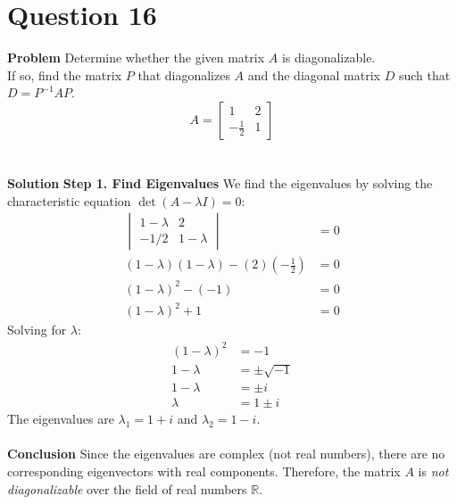\documentclass{article}
\begin{document}
\section{Question 16}
\textbf{Problem}
Determine whether the given matrix $A$ is diagonalizable. \\
If so, find the matrix $P$ that diagonalizes $A$ and the diagonal matrix $D$
such that $D = P^{-1}AP$.
\[
	A =
	\begin{bmatrix}
		1            & 2 \\
		-\frac{1}{2} & 1
	\end{bmatrix}
\]
\\
\\
\textbf{Solution}
\textbf{Step 1. Find Eigenvalues}
We find the eigenvalues by solving the characteristic equation
$\det(A - \lambda I) = 0$:
\begin{align*}
	\begin{vmatrix} 1 - \lambda & 2 \\ -1/2 & 1 - \lambda \end{vmatrix} & = 0 \\
	(1 - \lambda)(1 - \lambda) - (2)\left(-\frac{1}{2}\right)           & = 0 \\
	(1 - \lambda)^2 - (-1)                                              & = 0 \\
	(1 - \lambda)^2 + 1                                                 & = 0
\end{align*}
Solving for $\lambda$:
\begin{align*}
	(1 - \lambda)^2 & = -1            \\
	1 - \lambda     & = \pm \sqrt{-1} \\
	1 - \lambda     & = \pm i         \\
	\lambda         & = 1 \pm i
\end{align*}
The eigenvalues are $\lambda_1 = 1 + i$ and $\lambda_2 = 1 - i$.
\\
\\
\textbf{Conclusion}
Since the eigenvalues are complex (not real numbers), there are no corresponding
eigenvectors with real components. Therefore, the matrix $A$ is
\textit{not diagonalizable} over the field of real numbers $\mathbb{R}$.

\pagebreak

\end{document}
